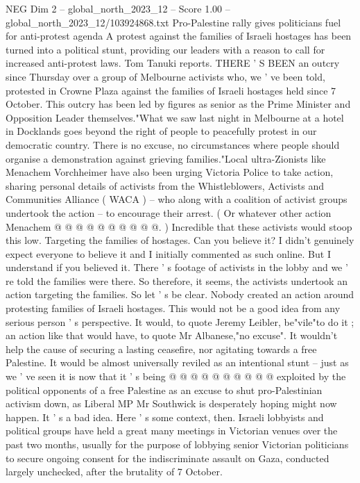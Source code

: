 \begin{textsample}{NEG Dim 2 – global\_north\_2023\_12 – Score 1.00 – global\_north\_2023\_12/103924868.txt}  \label{ex:f2_neg_205}
Pro-Palestine rally gives politicians fuel for anti-protest agenda A protest against the families of Israeli hostages has been turned into a political stunt, providing our leaders with a reason to call for increased anti-protest laws.
Tom Tanuki reports.
THERE ' S BEEN an outcry since Thursday over a group of Melbourne activists who, we ' ve been told, protested in Crowne Plaza against the families of Israeli hostages held since 7 October.
This outcry has been led by figures as senior as the Prime Minister and Opposition Leader themselves."What we saw last night in Melbourne at a hotel in Docklands goes beyond the right of people to peacefully protest in our democratic country.
There is no excuse, no circumstances where people should organise a demonstration against grieving families."Local ultra-Zionists like Menachem Vorchheimer have also been urging Victoria Police to take action, sharing personal details of activists from the Whistleblowers, Activists and Communities Alliance ( WACA ) -- who along with a coalition of activist groups undertook the action -- to encourage their arrest. ( Or whatever other action Menachem @ @ @ @ @ @ @ @ @ @. ) Incredible that these activists would stoop this low.
Targeting the families of hostages.
Can you believe it?
I didn't genuinely expect everyone to believe it and I initially commented as such online.
But I understand if you believed it.
There ' s footage of activists in the lobby and we ' re told the families were there.
So therefore, it seems, the activists undertook an action targeting the families.
So let ' s be clear.
Nobody created an action around protesting families of Israeli hostages.
This would not be a good idea from any serious person ' s perspective.
It would, to quote Jeremy Leibler, be"vile"to do it ; an action like that would have, to quote Mr Albanese,"no excuse".
It wouldn't help the cause of securing a lasting ceasefire, nor agitating towards a free Palestine.
It would be almost universally reviled as an intentional stunt -- just as we ' ve seen it is now that it ' s being @ @ @ @ @ @ @ @ @ @ exploited by the political opponents of a free Palestine as an excuse to shut pro-Palestinian activism down, as Liberal MP Mr Southwick is desperately hoping might now happen.
It ' s a bad idea.
Here ' s some context, then.
Israeli lobbyists and political groups have held a great many meetings in Victorian venues over the past two months, usually for the purpose of lobbying senior Victorian politicians to secure ongoing consent for the indiscriminate assault on Gaza, conducted largely unchecked, after the brutality of 7 October.

\end{textsample}
